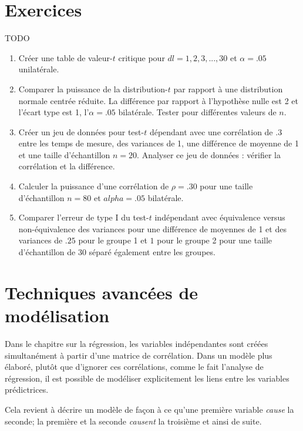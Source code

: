 \documentclass[
]{book}
\begin{document}
\hypertarget{exercice-analyse}{%
\chapter*{Exercices}\label{exercice-analyse}}

TODO

\begin{enumerate}
\def\labelenumi{\arabic{enumi}.}
\item
  Créer une table de valeur-\(t\) critique pour \(dl = 1,2,3 ,... ,30\) et \(\alpha=.05\) unilatérale.
\item
  Comparer la puissance de la distribution-\(t\) par rapport à une distribution normale centrée réduite. La différence par rapport à l'hypothèse nulle est 2 et l'écart type est 1, l'\(\alpha = .05\) bilatérale. Tester pour différentes valeurs de \(n\).
\item
  Créer un jeu de données pour test-\(t\) dépendant avec une corrélation de .3 entre les temps de mesure, des variances de 1, une différence de moyenne de 1 et une taille d'échantillon \(n = 20\). Analyser ce jeu de données : vérifier la corrélation et la différence.
\item
  Calculer la puissance d'une corrélation de \(\rho = .30\) pour une taille d'échantillon \(n=80\) et \(alpha = .05\) bilatérale.
\item
  Comparer l'erreur de type I du test-\(t\) indépendant avec équivalence versus non-équivalence des variances pour une différence de moyennes de 1 et des variances de \(.25\) pour le groupe 1 et \(1\) pour le groupe 2 pour une taille d'échantillon de 30 séparé également entre les groupes.
\end{enumerate}

\hypertarget{techniques-avancuxe9es-de-moduxe9lisation}{%
\chapter{Techniques avancées de modélisation}\label{techniques-avancuxe9es-de-moduxe9lisation}}

Dans le chapitre sur la régression, les variables indépendantes sont créées simultanément à partir d'une matrice de corrélation. Dans un modèle plus élaboré, plutôt que d'ignorer ces corrélations, comme le fait l'analyse de régression, il est possible de modéliser explicitement les liens entre les variables prédictrices.

Cela revient à décrire un modèle de façon à ce qu'une première variable \emph{cause} la seconde; la première et la seconde \emph{causent} la troisième et ainsi de suite.
\end{document}
